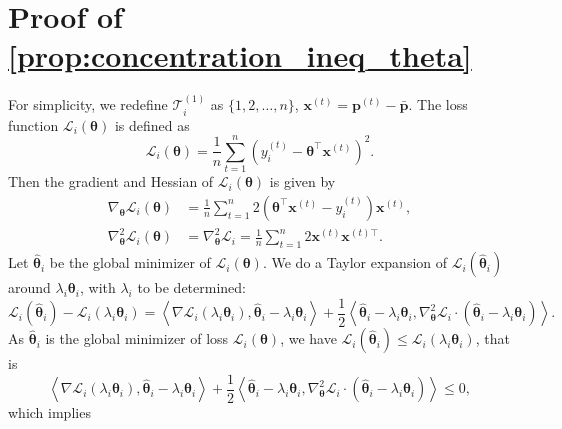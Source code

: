 \documentclass{article} %
\begin{document}
\section{Proof of \cref{prop:concentration_ineq_theta}}\label{app:concentration_ineq_theta}
For simplicity, we redefine $\mathcal{T}_i^{(1)}$ as $\{1,2,\dots, n\}$, $\mathbf{x}^{(t)} = \mathbf{p}^{(t)}- \bar{\mathbf{p}}$. The loss function $\mathscr{L}_i(\boldsymbol{\theta})$ is defined as
$$
\mathscr{L}_i(\boldsymbol{\theta})=\frac{1}{n} \sum_{t=1}^n\left(y_i^{(t)}-\boldsymbol{\theta}^{\top} \mathbf{x}^{(t)}\right)^{2}.
$$
Then the gradient and Hessian of $\mathscr{L}_i(\boldsymbol{\theta})$ is given by
$$
\begin{aligned}
\nabla_{\boldsymbol{\theta}} \mathscr{L}_i(\boldsymbol{\theta}) &=\frac{1}{n} \sum_{t=1}^n 2\left(\boldsymbol{\theta}^{\top} \mathbf{x}^{(t)}- y^{(t)}_i\right) \mathbf{x}^{(t)}, \\
\nabla_{\boldsymbol{\theta}}^{2} \mathscr{L}_i(\boldsymbol{\theta}) &=\nabla_{\boldsymbol{\theta}}^{2} \mathscr{L}_i=\frac{1}{n} \sum_{t=1}^n 2 \mathbf{x}^{(t)} \mathbf{x}^{(t)\top}.
\end{aligned}
$$
Let $\widehat{\boldsymbol{\theta}}_i$ be the global minimizer of $\mathscr{L}_i(\boldsymbol{\theta})$. We do a Taylor expansion of $\mathscr{L}_i(\widehat{\boldsymbol{\theta}}_{i})$ around $\lambda_i\boldsymbol{\theta}_i$, with $\lambda_i$ to be determined:
$$
\mathscr{L}_i(\widehat{\boldsymbol{\theta}}_{i})-\mathscr{L}_i\left(\lambda_i\boldsymbol{\theta}_i\right)=\left\langle\nabla \mathscr{L}_i\left(\lambda_i\boldsymbol{\theta}_i\right), \widehat{\boldsymbol{\theta}}_{i}-\lambda_i\boldsymbol{\theta}_i\right\rangle+\frac{1}{2}\left\langle\widehat{\boldsymbol{\theta}}_{i}-\lambda_i\boldsymbol{\theta}_i, \nabla_{\boldsymbol{\theta}}^{2} \mathscr{L}_i \cdot (\widehat{\boldsymbol{\theta}}_{i}-\lambda_i\boldsymbol{\theta}_i)\right\rangle.
$$
As $\widehat{\boldsymbol{\theta}}_{i}$ is the global minimizer of loss $\mathscr{L}_i(\boldsymbol{\theta})$, we have $\mathscr{L}_i(\widehat{\boldsymbol{\theta}}_{i})\leq \mathscr{L}_i\left(\lambda_i\boldsymbol{\theta}_i\right)$, that is
$$
\left\langle\nabla \mathscr{L}_i\left(\lambda_i\boldsymbol{\theta}_i\right), \widehat{\boldsymbol{\theta}}_{i}-\lambda_i\boldsymbol{\theta}_i\right\rangle+\frac{1}{2}\left\langle\widehat{\boldsymbol{\theta}}_{i}-\lambda_i\boldsymbol{\theta}_i, \nabla_{\boldsymbol{\theta}}^{2} \mathscr{L}_i \cdot (\widehat{\boldsymbol{\theta}}_{i}-\lambda_i\boldsymbol{\theta}_i)\right\rangle \leq 0,
$$
which implies
\end{document}

